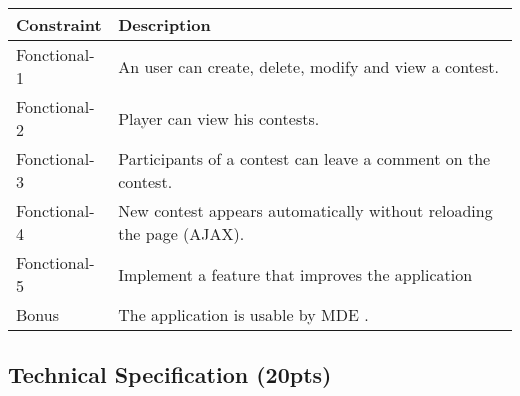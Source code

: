 \documentclass{article}         %
\newcounter{notetab}
\newcommand{\zero}{\setcounter{notetab}{0}}
\begin{document}
\zero
\begin{tabular}{|p{2cm}|p{10cm}|} %
  \hline
  Constraint & Description\\ %

  \hline
  Fonctional-1 & An user can create, delete, modify and view a contest. \\%
  Fonctional-2 & Player can view his contests. \\%
  Fonctional-3 & Participants of a contest can leave a comment on the contest. \\%
  Fonctional-4 & New contest appears automatically without reloading the page (AJAX). \\%
  Fonctional-5 & Implement a feature that improves the application \\%
  \hline
  \hline
  Bonus & The application is usable by MDE .\\%

  \hline
\end{tabular}


\subsection{Technical Specification (20pts)}
\end{document}
